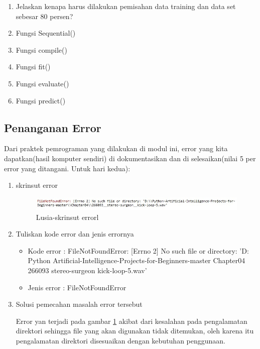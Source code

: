 \begin{enumerate}
\item Jelaskan kenapa harus dilakukan pemisahan data training dan data set sebesar 80 persen?

\item Fungsi Sequential()

\item Fungsi compile()

\item Fungsi fit()

\item Fungsi evaluate()

\item Fungsi predict()


\end{enumerate}

\subsection{Penanganan Error}
Dari praktek pemrograman yang dilakukan di modul ini, error yang kita dapatkan(hasil komputer sendiri) di dokumentasikan dan di selesaikan(nilai 5 per error yang ditangani. Untuk hari kedua):

\begin{enumerate}
	\item skrinsut error
		\begin{figure}[!hbtp]
		\centering
		\includegraphics[scale=0.5]{figures/u1.jpg}
		\caption{Lusia-skrinsut errorl}
		\label{6C1}
		\end{figure}
	\item Tuliskan kode error dan jenis errornya
		\begin{itemize}
			\item Kode error : FileNotFoundError: [Errno 2] No such file or directory: 'D: Python Artificial-Intelligence-Projects-for-Beginners-master  Chapter04 266093 stereo-surgeon kick-loop-5.wav'
			\item Jenis error : FileNotFoundError
		\end{itemize}
	\item Solusi pemecahan masalah error tersebut
		\par Error yan terjadi pada gambar \ref{6C1} akibat dari kesalahan pada pengalamatan direktori sehingga file yang akan digunakan tidak ditemukan, oleh karena itu pengalamatan direktori disesuaikan dengan kebutuhan penggunaan.
\end{enumerate}